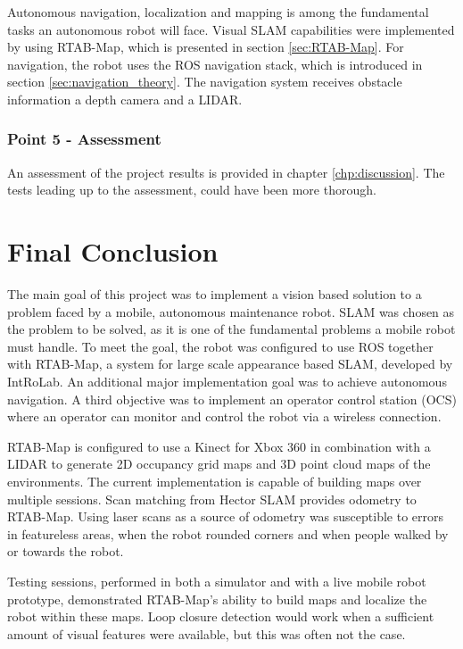 Autonomous navigation, localization and mapping is among the fundamental tasks an autonomous robot will face. Visual \ac{SLAM} capabilities were implemented by using \ac{RTAB-Map}, which is presented in section \ref{sec:RTAB-Map}. For navigation, the robot uses the \ac{ROS} navigation stack, which is introduced in section \ref{sec:navigation_theory}. The navigation system receives obstacle information a depth camera and a \ac{LIDAR}. 

\subsubsection{Point 5 - Assessment}

An assessment of the project results is provided in chapter \ref{chp:discussion}. The tests leading up to the assessment, could have been more thorough.

\section{Final Conclusion}



The main goal of this project was to implement a vision based solution to a problem faced by a mobile, autonomous maintenance robot. \ac{SLAM} was chosen as the problem to be solved, as it is one of the fundamental problems a mobile robot must handle.  To meet the goal, the robot was configured to use \ac{ROS} together with \ac{RTAB-Map}, a system for large scale appearance based \ac{SLAM}, developed by IntRoLab. An additional major implementation goal was to achieve autonomous navigation. A third objective was to implement an operator control station (\ac{OCS}) where an operator can monitor and control the robot via a wireless connection. 

\ac{RTAB-Map} is configured to use a Kinect for Xbox 360 in combination with a \ac{LIDAR} to generate 2D occupancy grid maps and 3D point cloud maps of the environments. The current implementation is capable of building maps over multiple sessions. Scan matching from Hector SLAM provides odometry to \ac{RTAB-Map}. Using laser scans as a source of odometry was susceptible to errors in featureless areas, when the robot rounded corners and when people walked by or towards the robot. 

Testing sessions, performed in both a simulator and with a live mobile robot prototype, demonstrated \ac{RTAB-Map}'s ability to build maps and localize the robot within these maps.  Loop closure detection would work when a sufficient amount of visual features were available, but this was often not the case.

